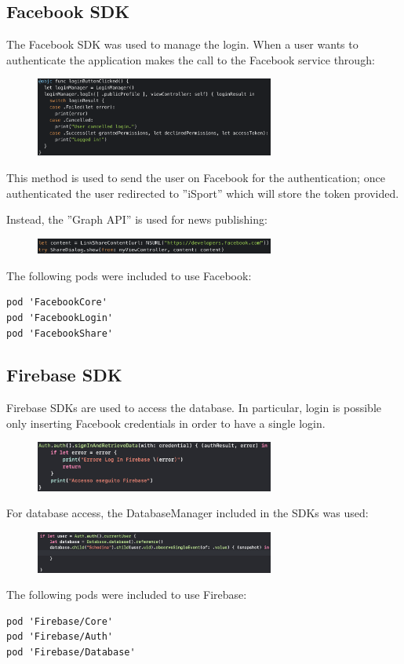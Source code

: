 \documentclass[numbers=noenddot, 12pt, a4paper, oneside]{scrbook}
\begin{document}
\subsection*{Facebook SDK}
The Facebook SDK was used to manage the login. When a user wants to authenticate the application makes the call to the Facebook service through:
\begin{figure}[H]
	\centering
	\includegraphics[width=0.7\textwidth]{images/LoginMethod}
\end{figure}
This method is used to send the user on Facebook for the authentication; once authenticated the user redirected to ”iSport” which will store the token provided.

Instead, the ”Graph API” is used for news publishing:
\begin{figure}[H]
	\centering
	\includegraphics[width=0.7\textwidth]{images/GraphAPI}
\end{figure}

The following pods were included to use Facebook:
\begin{lstlisting}[style=CStyle]
pod 'FacebookCore'
pod 'FacebookLogin'
pod 'FacebookShare'
\end{lstlisting}

\subsection*{Firebase SDK}
Firebase SDKs are used to access the database. In particular, login is possible only inserting Facebook credentials in order to have a single login.

\begin{figure}[H]
	\centering
	\includegraphics[width=0.7\textwidth]{images/LoginFirebase}
\end{figure}
For database access, the DatabaseManager included in the SDKs was used:
\begin{figure}[H]
	\centering
	\includegraphics[width=0.7\textwidth]{images/DBaccess}
\end{figure}
The following pods were included to use Firebase:
\begin{lstlisting}[style=CStyle]
pod 'Firebase/Core'
pod 'Firebase/Auth'
pod 'Firebase/Database'
\end{lstlisting}
\end{document}
